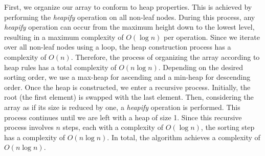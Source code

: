 First, we organize our array to conform to heap properties. This is achieved by performing the \textit{heapify} operation on all non-leaf nodes. During this process, any \textit{heapify} operation can occur from the maximum height down to the lowest level, resulting in a maximum complexity of \( O(\log n) \) per operation. Since we iterate over all non-leaf nodes using a loop, the heap construction process has a complexity of \( O(n) \). Therefore, the process of organizing the array according to heap rules has a total complexity of \( O(n \log n) \). Depending on the desired sorting order, we use a max-heap for ascending and a min-heap for descending order. Once the heap is constructed, we enter a recursive process. Initially, the root (the first element) is swapped with the last element. Then, considering the array as if its size is reduced by one, a \textit{heapify} operation is performed. This process continues until we are left with a heap of size 1. Since this recursive process involves \( n \) steps, each with a complexity of \( O(\log n) \), the sorting step has a complexity of \( O(n \log n) \). In total, the algorithm achieves a complexity of \( O(n \log n) \).